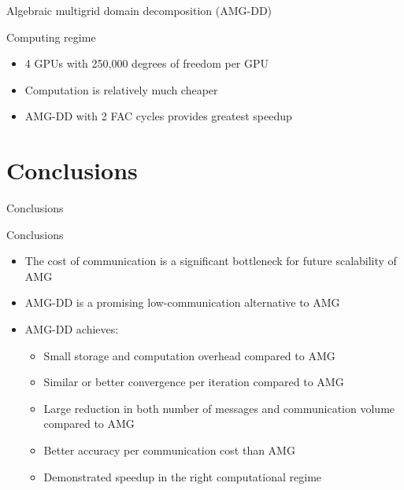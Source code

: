 \documentclass[18pt,xcolor=table]{beamer}
\begin{document}
\begin{frame}{Algebraic multigrid domain decomposition (AMG-DD)}
\begin{block}{Computing regime}
\begin{itemize}
\item 4 GPUs with 250,000 degrees of freedom per GPU
   \item Computation is relatively much cheaper
   \item AMG-DD with 2 FAC cycles provides greatest speedup
\end{itemize}
\end{block}

\centering
\vspace{0.5 cm}

\end{frame}



\section{Conclusions}

\begin{frame}{Conclusions}
\begin{block}{Conclusions}
\begin{itemize}
\item The cost of communication is a significant bottleneck for future scalability of AMG
\item AMG-DD is a promising low-communication alternative to AMG
\item AMG-DD achieves:
\begin{itemize}
\item Small storage and computation overhead compared to AMG
\item Similar or better convergence per iteration compared to AMG
\item Large reduction in both number of messages and communication volume compared to AMG
\item Better accuracy per communication cost than AMG
\item Demonstrated speedup in the right computational regime
\end{itemize}
\end{itemize}
\end{block}
\end{frame}
\end{document}
